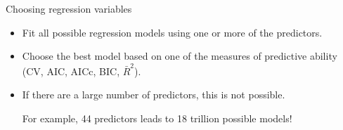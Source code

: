 \documentclass[14pt]{beamer}
\makeatletter
\def\biz{\begin{itemize}[<+-| alert@+>]}
\def\eiz{\end{itemize}}
\makeatother
\begin{document}
\begin{frame}{Choosing regression variables}


\biz
\item
Fit all possible regression models using one or more of the predictors.

\item
Choose the best model based on one of the measures of predictive ability (CV, AIC, AICc, BIC, $\bar{R}^2$).
\eiz

\vfill\pause

\begin{itemize}
\item If there are a large number of predictors, this is not possible.

For example, 44 predictors leads to 18 trillion possible models!
\end{itemize}

\end{frame}
\end{document}
